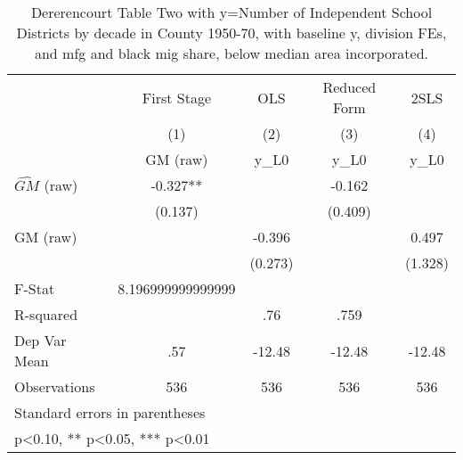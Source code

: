 \begin{table}[htbp]\centering
\def\sym#1{\ifmmode^{#1}\else\(^{#1}\)\fi}
\caption{Dererencourt Table Two with y=Number of Independent School Districts by decade in County 1950-70, with baseline y, division FEs, and mfg and black mig share, below median area incorporated.}
\begin{tabular}{l*{4}{c}}
\toprule
                    & First Stage   &         OLS   &Reduced Form   &        2SLS   \\
                    &\multicolumn{1}{c}{(1)}&\multicolumn{1}{c}{(2)}&\multicolumn{1}{c}{(3)}&\multicolumn{1}{c}{(4)}\\
                    &\multicolumn{1}{c}{GM  (raw)}&\multicolumn{1}{c}{y\_L0}&\multicolumn{1}{c}{y\_L0}&\multicolumn{1}{c}{y\_L0}\\
\midrule
$\hat{GM}$ (raw)    &      -0.327** &               &      -0.162   &               \\
                    &     (0.137)   &               &     (0.409)   &               \\
\addlinespace
GM  (raw)           &               &      -0.396   &               &       0.497   \\
                    &               &     (0.273)   &               &     (1.328)   \\
\midrule
F-Stat              &8.196999999999999   &               &               &               \\
R-squared           &               &         .76   &        .759   &               \\
Dep Var Mean        &         .57   &      -12.48   &      -12.48   &      -12.48   \\
Observations        &         536   &         536   &         536   &         536   \\
\bottomrule
\multicolumn{5}{l}{\footnotesize Standard errors in parentheses}\\
\multicolumn{5}{l}{\footnotesize * p<0.10, ** p<0.05, *** p<0.01}\\
\end{tabular}
\end{table}
